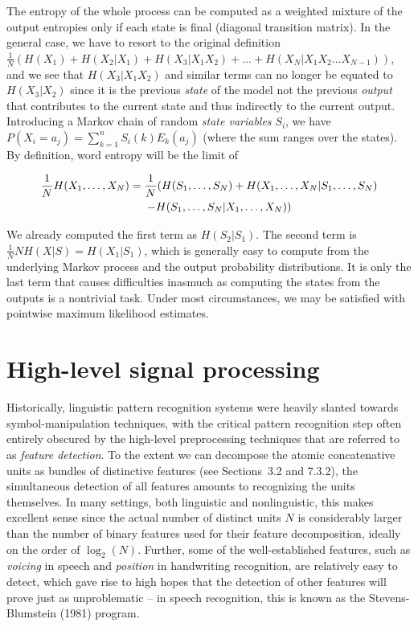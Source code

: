 The entropy of the whole process can be computed as a weighted mixture of the
output entropies only if each state is final (diagonal transition matrix). In
the general case, we have to resort to the original definition
$\frac{1}{N}(H(X_1)+H(X_2|X_1)+ H(X_3|X_1X_2)+\ldots +H(X_N|X_1X_2\ldots
X_{N-1}))$, and we see that $ H(X_3|X_1X_2)$ and similar terms can no longer be
equated to $ H(X_3|X_2)$ since it is the previous {\it state} of the model not
the previous {\it output} that contributes to the current state and thus
indirectly to the current output. Introducing a Markov chain of random {\it
state variables} $S_i$, we have $P(X_i=a_j) = \sum_{k=1}^n S_i(k) E_k(a_j)$
(where the sum ranges over the states). By definition, word entropy will be
the limit of

\begin{eqnarray}
\frac{1}{N}H(X_1,\ldots,X_N)=\frac{1}{N}(H(S_1,\ldots,S_N) + 
H(X_1,\ldots,X_N|S_1,\ldots,S_N) \nonumber\\
 - H(S_1,\ldots,S_N|X_1,\ldots,X_N))\hspace*{2.7cm}
\end{eqnarray}

\noindent We already computed the first term as $H(S_2|S_1)$. The second term
is $\frac{1}{N}NH(X|S) = H(X_1|S_1)$, which is generally easy to compute from
the underlying Markov process and the output probability distributions. It
is only the last term %
that causes difficulties inasmuch as computing the states from the outputs is
a nontrivial task. Under most circumstances, we may be satisfied with pointwise
maximum likelihood estimates.

\section{High-level signal processing}

Historically, linguistic pattern recognition systems were heavily slanted
towards symbol-manipulation techniques, with the critical pattern recognition
step often entirely obscured by the high-level preprocessing techniques that
are referred to as {\it feature detection}. To the
extent we can decompose the atomic concatenative units as bundles of
distinctive features (see Sections~3.2 and 7.3.2), the simultaneous detection
of all features amounts to recognizing the units themselves. In many settings,
both linguistic and nonlinguistic, this makes excellent sense since the
actual number of distinct units $N$ is considerably larger than the number of
binary features used for their feature decomposition, ideally on the order of
$\log_2(N)$. Further, some of the well-established features, such as {\it
  voicing} in speech and {\it position} in handwriting recognition, are
relatively easy to detect, which gave rise to high hopes that the detection of
other features will prove just as unproblematic -- in speech recognition, this
is known as the Stevens-Blumstein (1981) program.  \nocite{Stevens:1981}


